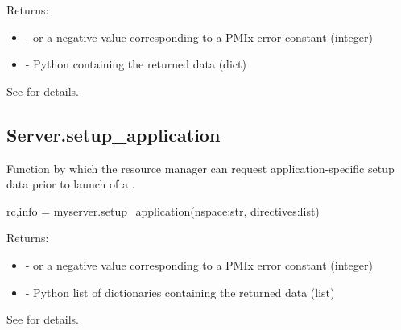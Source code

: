 \begin{arglist}
\end{arglist}

Returns:

\begin{itemize}
    \item {} -  or a negative value corresponding to a PMIx error constant (integer)
    \item {} - Python  containing the returned data (dict)
\end{itemize}

See  for details.


\subsection{Server.setup_application}

\summary
Function by which the resource manager can request application-specific setup data prior to launch of a .

\format

\pyspecificstart
\begin{codepar}
rc,info = myserver.setup_application(nspace:str, directives:list)
\end{codepar}
\pyspecificend


\begin{arglist}
\end{arglist}

Returns:

\begin{itemize}
    \item {} -  or a negative value corresponding to a PMIx error constant (integer)
    \item {} - Python list of  dictionaries containing the returned data (list)
\end{itemize}

See  for details.


